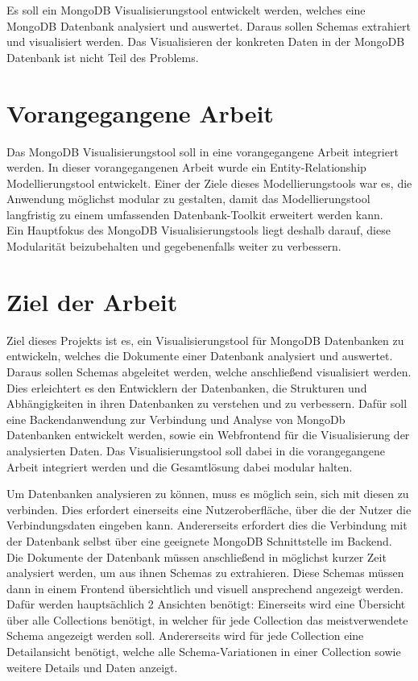 Es soll ein MongoDB Visualisierungstool entwickelt werden, welches eine MongoDB Datenbank analysiert und auswertet.
Daraus sollen Schemas extrahiert und visualisiert werden.
Das Visualisieren der konkreten Daten in der MongoDB Datenbank ist nicht Teil des Problems.

\section{Vorangegangene Arbeit}
\label{sec:vorangegangene_arbeit}

Das MongoDB Visualisierungstool soll in eine vorangegangene Arbeit integriert werden.
In dieser vorangegangenen Arbeit wurde ein Entity-Relationship Modellierungstool entwickelt.
Einer der Ziele dieses Modellierungstools war es, die Anwendung möglichst modular zu gestalten, damit das Modellierungstool langfristig zu einem umfassenden Datenbank-Toolkit erweitert werden kann.
~\autocite{ruttmann:projektarbeit}
Ein Hauptfokus des MongoDB Visualisierungstools liegt deshalb darauf, diese Modularität beizubehalten und gegebenenfalls weiter zu verbessern.

\section{Ziel der Arbeit}
\label{sec:ziel}

Ziel dieses Projekts ist es, ein Visualisierungstool für MongoDB Datenbanken zu entwickeln, welches die Dokumente einer Datenbank analysiert und auswertet.
Daraus sollen Schemas abgeleitet werden, welche anschließend visualisiert werden.
Dies erleichtert es den Entwicklern der Datenbanken, die Strukturen und Abhängigkeiten in ihren Datenbanken zu verstehen und zu verbessern.
Dafür soll eine Backendanwendung zur Verbindung und Analyse von MongoDb Datenbanken entwickelt werden, sowie ein Webfrontend für die Visualisierung der analysierten Daten.
Das Visualisierungstool soll dabei in die vorangegangene Arbeit integriert werden und die Gesamtlösung dabei modular halten.

Um Datenbanken analysieren zu können, muss es möglich sein, sich mit diesen zu verbinden.
Dies erfordert einerseits eine Nutzeroberfläche, über die der Nutzer die Verbindungsdaten eingeben kann.
Andererseits erfordert dies die Verbindung mit der Datenbank selbst über eine geeignete MongoDB Schnittstelle im Backend.
Die Dokumente der Datenbank müssen anschließend in möglichst kurzer Zeit analysiert werden, um aus ihnen Schemas zu extrahieren.
Diese Schemas müssen dann in einem Frontend übersichtlich und visuell ansprechend angezeigt werden.
Dafür werden hauptsächlich 2 Ansichten benötigt:
Einerseits wird eine Übersicht über alle Collections benötigt, in welcher  für jede Collection das meistverwendete Schema angezeigt werden soll.
Andererseits wird für jede Collection eine Detailansicht benötigt, welche alle Schema-Variationen in einer Collection sowie  weitere Details und Daten anzeigt.


